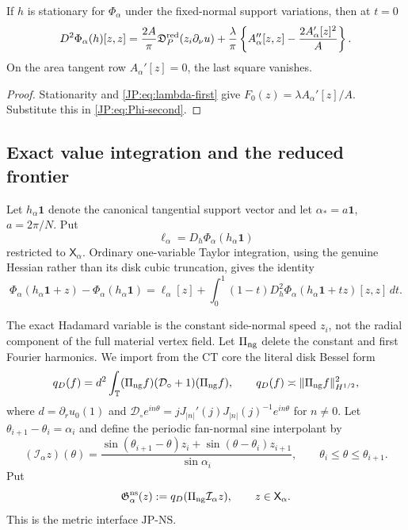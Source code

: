 \begin{corollary}
\label{JP:cor:stationary}
If $h$ is stationary for $\Phi_\alpha$ under the fixed-normal support
variations, then at $t=0$
\begin{equation}\label{JP:eq:stationary-specialization}
 D^2\Phi_\alpha(h)[z,z]
 =\frac{2A}{\pi}\mathfrak D^{\rm red}_P(z_i\partial_\nu u)
 +\frac\lambda\pi\left\{A_\alpha''[z,z]
       -\frac{2A_\alpha'[z]^2}{A}\right\}.
\end{equation}
On the area tangent row $A_\alpha'[z]=0$, the last square vanishes.
\end{corollary}

\begin{proof}
Stationarity and \eqref{JP:eq:lambda-first} give
$F_0(z)=\lambda A_\alpha'[z]/A$.  Substitute this in
\eqref{JP:eq:Phi-second}.
\end{proof}

\subsection{Exact value integration and the reduced frontier}

Let $h_\alpha\mathbf1$ denote the canonical tangential support vector and
let $\alpha_*=a\mathbf1$, $a=2\pi/N$.  Put
\begin{equation}\label{JP:eq:forcing}
 \ell_\alpha=D_h\Phi_\alpha(h_\alpha\mathbf1)
\end{equation}
restricted to $\mathsf X_\alpha$.  Ordinary one-variable Taylor
integration, using the genuine Hessian rather than its disk cubic
truncation, gives the identity
\begin{equation}\label{JP:eq:exact-integration}
 \boxed{
 \Phi_\alpha(h_\alpha\mathbf1+z)-\Phi_\alpha(h_\alpha\mathbf1)
 =\ell_\alpha[z]
 +\int_0^1(1-t)
 D_h^2\Phi_\alpha(h_\alpha\mathbf1+tz)[z,z]\,dt.}
\end{equation}

The exact Hadamard variable is the constant side-normal speed $z_i$, not
the radial component of the full material vertex field.  Let
$\Pi_{\rm ng}$ delete the constant and first Fourier harmonics.  We import
from the CT core the literal disk Bessel form
\[
 q_D(f)=d^2\int_{\mathbb T}(\Pi_{\rm ng}f)
       (\mathcal D_\circ+1)(\Pi_{\rm ng}f),
 \qquad
 q_D(f)\asymp\|\Pi_{\rm ng}f\|_{H^{1/2}}^2,
\]
where $d=\partial_ru_0(1)$ and
$\mathcal D_\circ e^{in\theta}
=jJ_{|n|}'(j)J_{|n|}(j)^{-1}e^{in\theta}$ for $n\ne0$.
Let $\theta_{i+1}-\theta_i=\alpha_i$ and define the periodic fan-normal sine
interpolant by
\begin{equation}\label{JP:eq:normal-speed-interpolant}
 (\mathcal I_\alpha z)(\theta)
 =\frac{\sin(\theta_{i+1}-\theta)z_i
         +\sin(\theta-\theta_i)z_{i+1}}{\sin\alpha_i},\qquad
 \theta_i\le\theta\le\theta_{i+1}.
\end{equation}
Put
\begin{equation}\label{JP:eq:normal-speed-metric}
 \mathfrak G_\alpha^{\rm ns}(z)
 :=q_D(\Pi_{\rm ng}\mathcal I_\alpha z),
 \qquad z\in\mathsf X_\alpha.
\end{equation}
This is the metric interface \(\mathrm{JP\text{-}NS}\).

